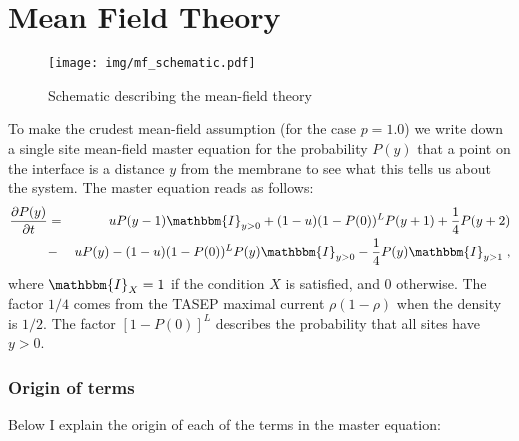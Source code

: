 \documentclass[a4paper,10pt]{article}
\newcommand{\I}{\mathbbm{I}}
\newcommand{\pzero}{P(0)}
\begin{document}
\newpage\phantom{blabla}
\newpage\phantom{blabla}
\newpage\phantom{blabla}
\section{Mean Field Theory}

\begin{figure}[h!]
  \centering
  \texttt{[image: img/mf\_schematic.pdf]}
  \caption{Schematic describing the mean-field theory}
\end{figure}

To make the crudest mean-field assumption (for the case $p=1.0$) we write down a single site mean-field master equation for the probability $P(y)$ that a point on the interface is a distance $y$ from the membrane to see what this tells us about the system. The master equation reads as follows:
\begin{eqnarray}
  \frac{\partial P(y)}{\partial t} & = & uP(y-1) \I_{y>0} + (1-u)(1-P(0))^L P(y+1) + \frac{1}{4}P(y+2) \nonumber \\
                                   & - & uP(y) - (1-u)(1-P(0))^L P(y)\I_{y>0} -  \frac{1}{4}P(y) \I_{y>1} \;,
\end{eqnarray}
where $\I_X = 1$ if the condition $X$ is satisfied, and $0$ otherwise. The factor $1/4$ comes from the TASEP maximal current $\rho(1-\rho)$ when the density is $1/2$. The factor $[1-\pzero]^L$ describes the probability that all sites have $y>0$. 

\subsubsection{Origin of terms}

Below I explain the origin of each of the terms in the master equation:
\end{document}
